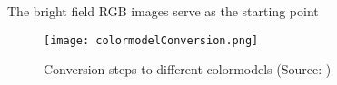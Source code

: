 The bright field RGB images serve as the starting point 
\begin{figure}[h]
	\centering
	\texttt{[image: colormodelConversion.png]}
	\caption{Conversion steps to different colormodels (Source: \cite{viscarra_rossel_using_2008})}
\end{figure}

